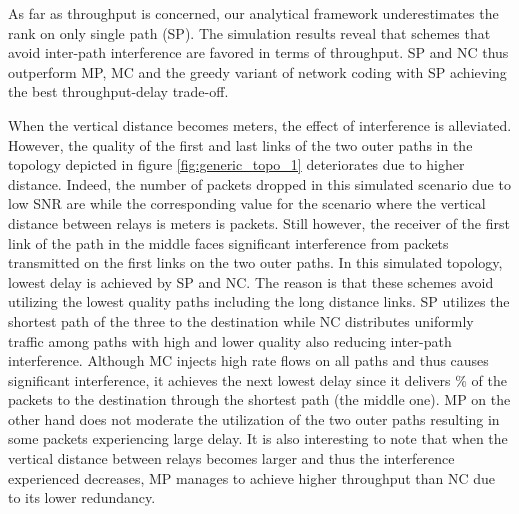 \documentclass[journal, onecolumn, 12pt]{IEEEtran}
\begin{document}
As far as throughput is concerned, our analytical framework underestimates the rank on only single path (SP).
The simulation results reveal that schemes that avoid inter-path interference are favored in terms of throughput. SP and NC thus outperform MP, MC and the greedy variant of network coding
with SP achieving the best throughput-delay trade-off.

When the vertical distance becomes  meters, the effect of interference is alleviated.
However, the quality of the first and last links of the two outer paths in the topology depicted in figure \ref{fig:generic_topo_1} deteriorates due to higher distance.
Indeed, the number of packets dropped in this simulated scenario due to low SNR are  while the corresponding value for the scenario where the vertical distance between relays is  meters is  packets.
Still however, the receiver of the first link of the path in the middle faces significant interference from packets transmitted on the first links on the two outer paths.
In this simulated topology, lowest delay is achieved by SP and NC.
The reason is that these schemes avoid utilizing the lowest quality paths including the long distance links.
SP utilizes the shortest path of the three to the destination while NC distributes uniformly traffic among paths with high and lower quality also reducing inter-path interference.
Although MC injects high rate flows on all paths and thus causes significant interference, it achieves the next lowest delay since it delivers \% of the packets to the destination
through the shortest path (the middle one).
MP on the other hand does not moderate the utilization of the two outer paths resulting in some packets experiencing large delay.
It is also interesting to note that when the vertical distance between relays becomes larger and thus the interference experienced decreases, MP manages to achieve higher
throughput than NC due to its lower redundancy.
\end{document}
